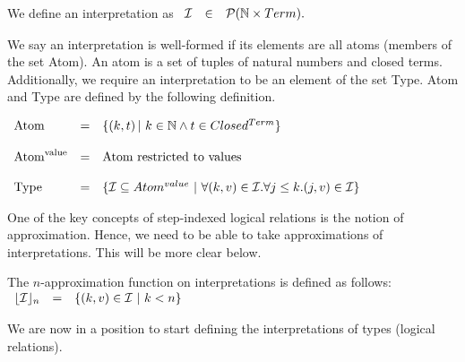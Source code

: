 \begin{definition}
  \label{def:interpretations}
  We define an interpretation as
  \begin{math}
    \begin{array}{lll}
      \mathcal{I} & \in & \mathcal{P}(\mathbb{N} \times Term).\\
    \end{array}
  \end{math}
\end{definition}
\noindent
We say an interpretation is well-formed if its elements are all atoms
(members of the set Atom). An atom is a set of tuples of natural
numbers and closed terms. Additionally, we require an interpretation
to be an element of the set Type.  Atom and Type are defined by the
following definition.
\begin{definition}
  \label{def:wellformed_interpretations}
  \begin{math}
    \begin{array}{lllll}
      \text{Atom} & = & \{ (k,t) \,|\ k \in \nat \land t \in Closed^{Term} \}\\
      & \\
      \text{Atom}^{\text{value}} & = & \text{Atom restricted to values}\\
      & \\
      \text{Type} & = & \{ \mathcal{I} \subseteq Atom^{value}\ |\ 
      \forall (k,v) \in \mathcal{I} . \forall j \leq k.(j,v) \in \mathcal{I} \}
      & \\
    \end{array}
  \end{math}
\end{definition}
\noindent
One of the key concepts of step-indexed logical relations is the
notion of approximation.  Hence, we need to be able to take
approximations of interpretations.  This will be more clear below.
\begin{definition}
  \label{def:approximations_of_interpretations}
  The $n$-approximation function on interpretations is defined as follows:\\
  \begin{math}
    \begin{array}{lll}
      \napprox{\interpset}{n} & = & \{ (k,v) \in \interpset\ |\ k < n\}
    \end{array}
  \end{math}
\end{definition}
We are now in a position to start defining the interpretations of
types (logical relations).  
